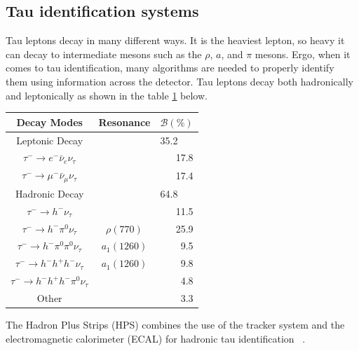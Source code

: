 \subsection{Tau identification systems}
Tau leptons decay in many different ways. It is the heaviest lepton, so heavy it can decay to intermediate mesons such as the $\rho$, $a$, and $\pi$ mesons.
Ergo, when it comes to tau identification, many algorithms are needed to properly identify them using information across the detector. 
Tau leptons decay both hadronically and leptonically as shown in the table \ref{tab:taudecay} below. 



\begin{table}[h!tbp]
\centering
\label{tab:taudecay}
\begin{tabular}{c c r}
Decay Modes & Resonance & \multicolumn{1}{c}{$\mathcal{B}(\%)$} \\\hline
Leptonic Decay && \multicolumn{1}{l}{35.2}\\
$\tau^- \rightarrow e^- \bar{\nu}_e \nu_\tau $ & & 17.8 \\
$\tau^- \rightarrow \mu^- \bar{\nu}_\mu \nu_\tau$ & & 17.4 \\\hline
Hadronic Decay && \multicolumn{1}{l}{64.8}\\
$\tau^- \rightarrow h^-\nu_\tau$ & & 11.5 \\
$\tau^- \rightarrow h^-\pi^0 \nu_\tau$ & $\rho(770)$ & 25.9 \\
$\tau^- \rightarrow h^-\pi^0 \pi^0 \nu_\tau$ & $a_1(1260)$ & 9.5 \\
$\tau^- \rightarrow h^- h^+ h^- \nu_\tau$ & $a_1(1260)$ & 9.8 \\
$\tau^- \rightarrow h^- h^+ h^- \pi^0 \nu_\tau$ & & 4.8 \\
Other & & 3.3 \\\hline
\end{tabular}
\end{table}


The Hadron Plus Strips (HPS) combines the use of the tracker system and the electromagnetic calorimeter (ECAL) for hadronic tau identification ~\cite{Sirunyan_2018}.  


